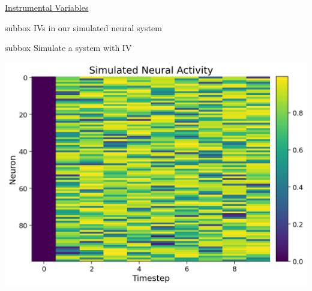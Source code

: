 \begin{textbox}{\href{https://compneuro.neuromatch.io/tutorials/W3D5_NetworkCausality/student/W3D5_Tutorial4.html}{Instrumental Variables }   }
\begin{subbox}{subbox}{ IVs in our simulated neural system
}
\begin{center}
\end{center}
\end{subbox}
\begin{subbox}{subbox}{  Simulate a system with IV
}
\scriptsize

\begin{center}
    
\includegraphics[scale=0.2]{Figures/NC/NC_Figure20.png}

\end{center}
\end{subbox}

\end{textbox}
